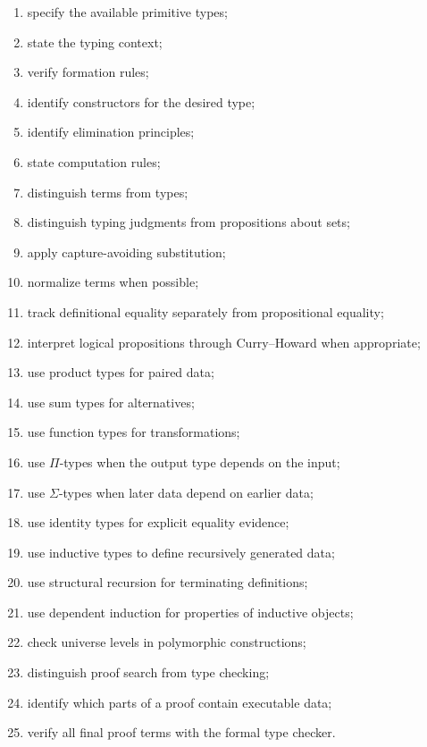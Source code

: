 \begin{enumerate}
    \item specify the available primitive types;
    \item state the typing context;
    \item verify formation rules;
    \item identify constructors for the desired type;
    \item identify elimination principles;
    \item state computation rules;
    \item distinguish terms from types;
    \item distinguish typing judgments from propositions about sets;
    \item apply capture-avoiding substitution;
    \item normalize terms when possible;
    \item track definitional equality separately from propositional
          equality;
    \item interpret logical propositions through Curry--Howard when
          appropriate;
    \item use product types for paired data;
    \item use sum types for alternatives;
    \item use function types for transformations;
    \item use \(\Pi\)-types when the output type depends on the input;
    \item use \(\Sigma\)-types when later data depend on earlier data;
    \item use identity types for explicit equality evidence;
    \item use inductive types to define recursively generated data;
    \item use structural recursion for terminating definitions;
    \item use dependent induction for properties of inductive objects;
    \item check universe levels in polymorphic constructions;
    \item distinguish proof search from type checking;
    \item identify which parts of a proof contain executable data;
    \item verify all final proof terms with the formal type checker.
\end{enumerate}

